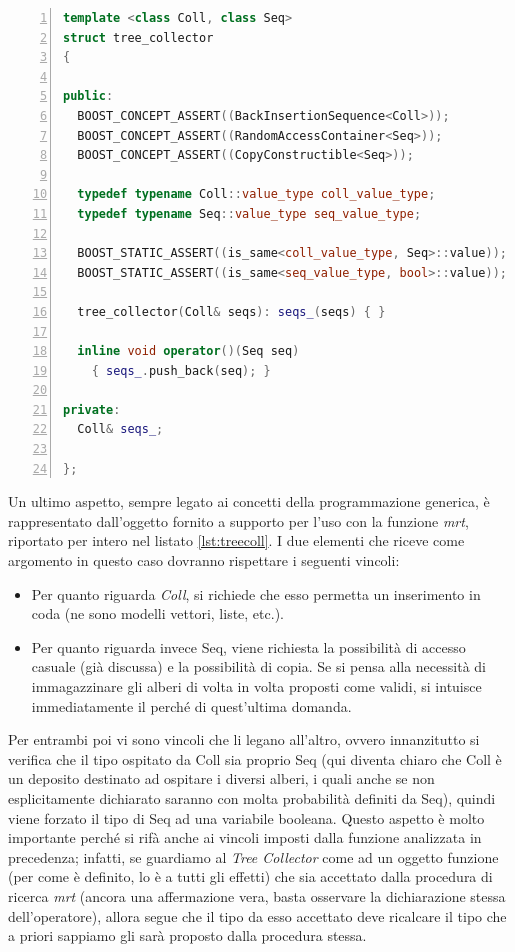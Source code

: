 \begin{lstlisting}[basicstyle=\small,language=C++,caption={Tree Collector},float,captionpos=b,label={lst:treecoll},frame=lines,numbers=left]
template <class Coll, class Seq>
struct tree_collector
{

public:
  BOOST_CONCEPT_ASSERT((BackInsertionSequence<Coll>));
  BOOST_CONCEPT_ASSERT((RandomAccessContainer<Seq>));
  BOOST_CONCEPT_ASSERT((CopyConstructible<Seq>));

  typedef typename Coll::value_type coll_value_type;
  typedef typename Seq::value_type seq_value_type;

  BOOST_STATIC_ASSERT((is_same<coll_value_type, Seq>::value));
  BOOST_STATIC_ASSERT((is_same<seq_value_type, bool>::value));

  tree_collector(Coll& seqs): seqs_(seqs) { }

  inline void operator()(Seq seq)
    { seqs_.push_back(seq); }

private:
  Coll& seqs_;

};
\end{lstlisting}

Un ultimo aspetto, sempre legato ai concetti della programmazione generica, è rappresentato dall'oggetto fornito a supporto per l'uso con la funzione \textit{mrt}, riportato per intero nel listato \ref{lst:treecoll}. I due elementi che riceve come argomento in questo caso dovranno rispettare i seguenti vincoli:
\begin{itemize}
 \item Per quanto riguarda \textit{Coll}, si richiede che esso permetta un inserimento in coda (ne sono modelli vettori, liste, etc.).
 \item Per quanto riguarda invece Seq, viene richiesta la possibilità di accesso casuale (già discussa) e la possibilità di copia. Se si pensa alla necessità di immagazzinare gli alberi di volta in volta proposti come validi, si intuisce immediatamente il perché di quest'ultima domanda.
\end{itemize}
Per entrambi poi vi sono vincoli che li legano all'altro, ovvero innanzitutto si verifica che il tipo ospitato da Coll sia proprio Seq (qui diventa chiaro che Coll è un deposito destinato ad ospitare i diversi alberi, i quali anche se non esplicitamente dichiarato saranno con molta probabilità definiti da Seq), quindi viene forzato il tipo di Seq ad una variabile booleana. Questo aspetto è molto importante perché si rifà anche ai vincoli imposti dalla funzione analizzata in precedenza; infatti, se guardiamo al \textit{Tree Collector} come ad un oggetto funzione (per come è definito, lo è a tutti gli effetti) che sia accettato dalla procedura di ricerca \textit{mrt} (ancora una affermazione vera, basta osservare la dichiarazione stessa dell'operatore), allora segue che il tipo da esso accettato deve ricalcare il tipo che a priori sappiamo gli sarà proposto dalla procedura stessa.

